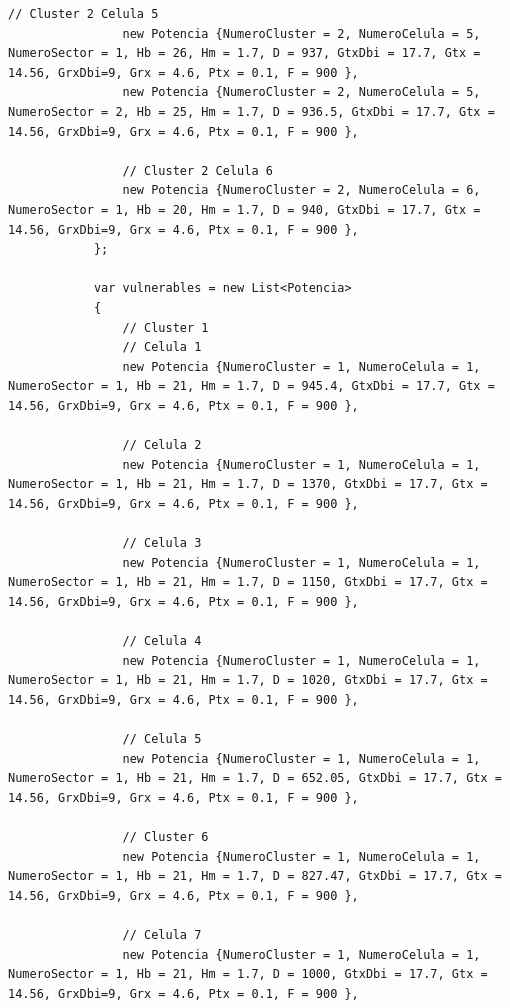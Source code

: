 \documentclass[11pt,letterpaper]{article}
\begin{document}
\begin{lstlisting}[style=CStyle]
                // Cluster 2 Celula 5
                new Potencia {NumeroCluster = 2, NumeroCelula = 5, NumeroSector = 1, Hb = 26, Hm = 1.7, D = 937, GtxDbi = 17.7, Gtx = 14.56, GrxDbi=9, Grx = 4.6, Ptx = 0.1, F = 900 },
                new Potencia {NumeroCluster = 2, NumeroCelula = 5, NumeroSector = 2, Hb = 25, Hm = 1.7, D = 936.5, GtxDbi = 17.7, Gtx = 14.56, GrxDbi=9, Grx = 4.6, Ptx = 0.1, F = 900 },

                // Cluster 2 Celula 6
                new Potencia {NumeroCluster = 2, NumeroCelula = 6, NumeroSector = 1, Hb = 20, Hm = 1.7, D = 940, GtxDbi = 17.7, Gtx = 14.56, GrxDbi=9, Grx = 4.6, Ptx = 0.1, F = 900 },
            };

            var vulnerables = new List<Potencia>
            {
                // Cluster 1 
                // Celula 1
                new Potencia {NumeroCluster = 1, NumeroCelula = 1, NumeroSector = 1, Hb = 21, Hm = 1.7, D = 945.4, GtxDbi = 17.7, Gtx = 14.56, GrxDbi=9, Grx = 4.6, Ptx = 0.1, F = 900 },

                // Celula 2
                new Potencia {NumeroCluster = 1, NumeroCelula = 1, NumeroSector = 1, Hb = 21, Hm = 1.7, D = 1370, GtxDbi = 17.7, Gtx = 14.56, GrxDbi=9, Grx = 4.6, Ptx = 0.1, F = 900 },

                // Celula 3
                new Potencia {NumeroCluster = 1, NumeroCelula = 1, NumeroSector = 1, Hb = 21, Hm = 1.7, D = 1150, GtxDbi = 17.7, Gtx = 14.56, GrxDbi=9, Grx = 4.6, Ptx = 0.1, F = 900 },

                // Celula 4
                new Potencia {NumeroCluster = 1, NumeroCelula = 1, NumeroSector = 1, Hb = 21, Hm = 1.7, D = 1020, GtxDbi = 17.7, Gtx = 14.56, GrxDbi=9, Grx = 4.6, Ptx = 0.1, F = 900 },

                // Celula 5
                new Potencia {NumeroCluster = 1, NumeroCelula = 1, NumeroSector = 1, Hb = 21, Hm = 1.7, D = 652.05, GtxDbi = 17.7, Gtx = 14.56, GrxDbi=9, Grx = 4.6, Ptx = 0.1, F = 900 },

                // Cluster 6
                new Potencia {NumeroCluster = 1, NumeroCelula = 1, NumeroSector = 1, Hb = 21, Hm = 1.7, D = 827.47, GtxDbi = 17.7, Gtx = 14.56, GrxDbi=9, Grx = 4.6, Ptx = 0.1, F = 900 },

                // Celula 7
                new Potencia {NumeroCluster = 1, NumeroCelula = 1, NumeroSector = 1, Hb = 21, Hm = 1.7, D = 1000, GtxDbi = 17.7, Gtx = 14.56, GrxDbi=9, Grx = 4.6, Ptx = 0.1, F = 900 },


\end{lstlisting}
\end{document}
